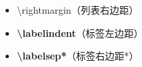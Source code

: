 ﻿\documentclass{article}
\begin{document}
\begin{itemize}
        \item \textbackslash{}rightmargin（列表右边距）
        \item \textbf{\textbackslash{}labelindent}（标签左边距）
        \item \textbf{\textbackslash{}labelsep*}（标签右边距*）
    \end{itemize}

\dotfill
\end{document}
